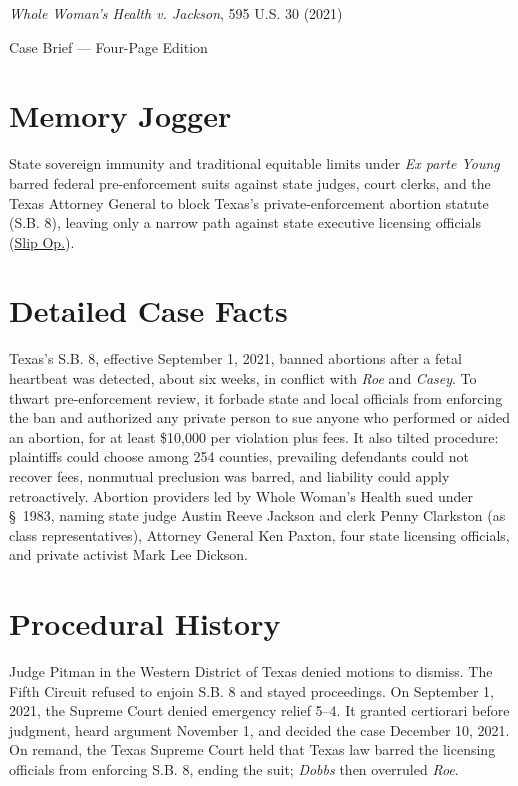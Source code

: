 \documentclass[12pt]{article}
\begin{document}
\begin{center}
{\LARGE \textit{Whole Woman's Health v. Jackson}, 595 U.S. 30 (2021)\par}
\vspace{0.8em}
{\large Case Brief --- Four-Page Edition\par}
\end{center}
\vspace{1em}

\section{Memory Jogger}

State sovereign immunity and traditional equitable limits under \textit{Ex parte Young} barred federal pre-enforcement suits against state judges, court clerks, and the Texas Attorney General to block Texas's private-enforcement abortion statute (S.B. 8), leaving only a narrow path against state executive licensing officials (\href{https://www.supremecourt.gov/opinions/21pdf/21-463_3ebh.pdf}{Slip Op.}).

\section{Detailed Case Facts}

Texas's S.B. 8, effective September 1, 2021, banned abortions after a fetal heartbeat was detected, about six weeks, in conflict with \textit{Roe} and \textit{Casey}. To thwart pre-enforcement review, it forbade state and local officials from enforcing the ban and authorized any private person to sue anyone who performed or aided an abortion, for at least \$10,000 per violation plus fees. It also tilted procedure: plaintiffs could choose among 254 counties, prevailing defendants could not recover fees, nonmutual preclusion was barred, and liability could apply retroactively. Abortion providers led by Whole Woman's Health sued under \S~1983, naming state judge Austin Reeve Jackson and clerk Penny Clarkston (as class representatives), Attorney General Ken Paxton, four state licensing officials, and private activist Mark Lee Dickson.

\section{Procedural History}

Judge Pitman in the Western District of Texas denied motions to dismiss. The Fifth Circuit refused to enjoin S.B. 8 and stayed proceedings. On September 1, 2021, the Supreme Court denied emergency relief 5--4. It granted certiorari before judgment, heard argument November 1, and decided the case December 10, 2021. On remand, the Texas Supreme Court held that Texas law barred the licensing officials from enforcing S.B. 8, ending the suit; \textit{Dobbs} then overruled \textit{Roe}.
\end{document}
